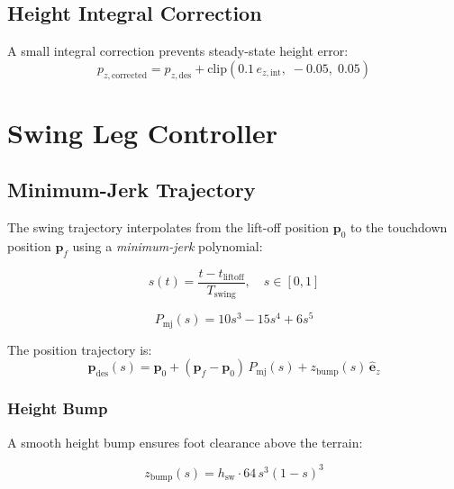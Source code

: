 \documentclass[12pt,a4paper]{report}
\newcommand{\vect}[1]{\bm{#1}}
\begin{document}
\section{Height Integral Correction}

A small integral correction prevents steady-state height error:
\begin{equation}
    p_{z,\text{corrected}} = p_{z,\text{des}} + \text{clip}\!\left(0.1\,e_{z,\text{int}},\;-0.05,\;0.05\right)
\end{equation}

\chapter{Swing Leg Controller}

\section{Minimum-Jerk Trajectory}

The swing trajectory interpolates from the lift-off position $\vect{p}_0$
to the touchdown position $\vect{p}_f$ using a \emph{minimum-jerk} polynomial:

\begin{equation}
    s(t) = \frac{t - t_\text{liftoff}}{T_\text{swing}}, \quad s \in [0, 1]
\end{equation}

\begin{equation}
    P_\text{mj}(s) = 10s^3 - 15s^4 + 6s^5
    \label{eq:minjerk}
\end{equation}

The position trajectory is:
\begin{equation}
    \vect{p}_\text{des}(s) = \vect{p}_0 + (\vect{p}_f - \vect{p}_0)\,P_\text{mj}(s)
                             + z_\text{bump}(s)\,\hat{\vect{e}}_z
\end{equation}

\subsection{Height Bump}

A smooth height bump ensures foot clearance above the terrain:

\begin{equation}
    z_\text{bump}(s) = h_\text{sw}\cdot 64\,s^3(1-s)^3
    \label{eq:heightbump}
\end{equation}
\end{document}
